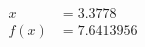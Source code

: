 \documentclass[preview]{standalone}
\begin{document}
\begin{align*}
x &= 3.3778\\f(x) &= 7.6413956
\end{align*}
\end{document}
